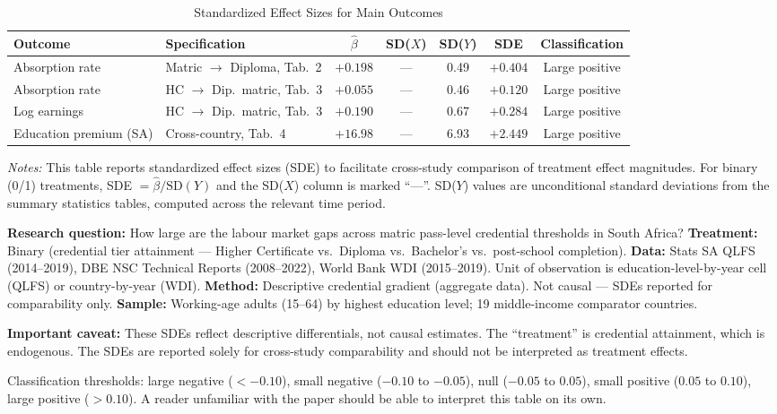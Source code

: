 \documentclass[12pt]{article}
\begin{document}
\begin{table}[H]
\centering
\caption{Standardized Effect Sizes for Main Outcomes}
\label{tab:sde}
\begin{adjustbox}{max width=\textwidth}
\begin{tabular}{llccccc}
\toprule
Outcome & Specification & $\hat{\beta}$ & SD($X$) & SD($Y$) & SDE & Classification \\
\midrule
Absorption rate   & Matric $\rightarrow$ Diploma, Tab.\ 2 & $+0.198$ & --- & 0.49 & $+0.404$ & Large positive \\
Absorption rate   & HC $\rightarrow$ Dip.\ matric, Tab.\ 3 & $+0.055$ & --- & 0.46 & $+0.120$ & Large positive \\
Log earnings      & HC $\rightarrow$ Dip.\ matric, Tab.\ 3 & $+0.190$ & --- & 0.67 & $+0.284$ & Large positive \\
Education premium (SA) & Cross-country, Tab.\ 4 & $+16.98$ & --- & 6.93 & $+2.449$ & Large positive \\
\bottomrule
\end{tabular}
\end{adjustbox}
\par\vspace{0.3em}
{\footnotesize \emph{Notes:} This table reports standardized effect sizes (SDE) to facilitate cross-study comparison of treatment effect magnitudes. For binary (0/1) treatments, SDE $= \hat{\beta} / \text{SD}(Y)$ and the SD($X$) column is marked ``---''. SD($Y$) values are unconditional standard deviations from the summary statistics tables, computed across the relevant time period.

\textbf{Research question:} How large are the labour market gaps across matric pass-level credential thresholds in South Africa?
\textbf{Treatment:} Binary (credential tier attainment --- Higher Certificate vs.\ Diploma vs.\ Bachelor's vs.\ post-school completion).
\textbf{Data:} Stats SA QLFS (2014--2019), DBE NSC Technical Reports (2008--2022), World Bank WDI (2015--2019). Unit of observation is education-level-by-year cell (QLFS) or country-by-year (WDI).
\textbf{Method:} Descriptive credential gradient (aggregate data). Not causal --- SDEs reported for comparability only.
\textbf{Sample:} Working-age adults (15--64) by highest education level; 19 middle-income comparator countries.

\textbf{Important caveat:} These SDEs reflect descriptive differentials, not causal estimates. The ``treatment'' is credential attainment, which is endogenous. The SDEs are reported solely for cross-study comparability and should not be interpreted as treatment effects.

Classification thresholds: large negative ($< -0.10$), small negative ($-0.10$ to $-0.05$), null ($-0.05$ to $0.05$), small positive ($0.05$ to $0.10$), large positive ($> 0.10$). A reader unfamiliar with the paper should be able to interpret this table on its own.}
\end{table}
\end{document}
